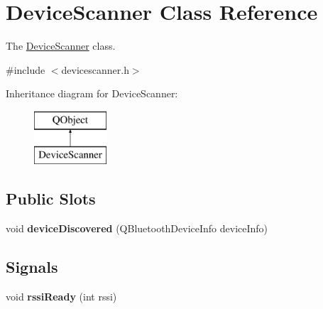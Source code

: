 \hypertarget{classDeviceScanner}{\section{Device\-Scanner Class Reference}
\label{classDeviceScanner}
}


The \hyperlink{classDeviceScanner}{Device\-Scanner} class.  




{\ttfamily \#include $<$devicescanner.\-h$>$}

Inheritance diagram for Device\-Scanner\-:\begin{figure}[H]
\begin{center}
\leavevmode
\includegraphics[height=2.000000cm]{classDeviceScanner}
\end{center}
\end{figure}
\subsection*{Public Slots}
\begin{DoxyCompactItemize}
\item 
\hypertarget{classDeviceScanner_ab7b6f00bb3e8ab9d7f1574c3d99224e6}{void {\bfseries device\-Discovered} (Q\-Bluetooth\-Device\-Info device\-Info)}\label{classDeviceScanner_ab7b6f00bb3e8ab9d7f1574c3d99224e6}

\end{DoxyCompactItemize}
\subsection*{Signals}
\begin{DoxyCompactItemize}
\item 
\hypertarget{classDeviceScanner_ab8859ba2a401533207d3ae57ee11d1e8}{void {\bfseries rssi\-Ready} (int rssi)}\label{classDeviceScanner_ab8859ba2a401533207d3ae57ee11d1e8}

\end{DoxyCompactItemize}
